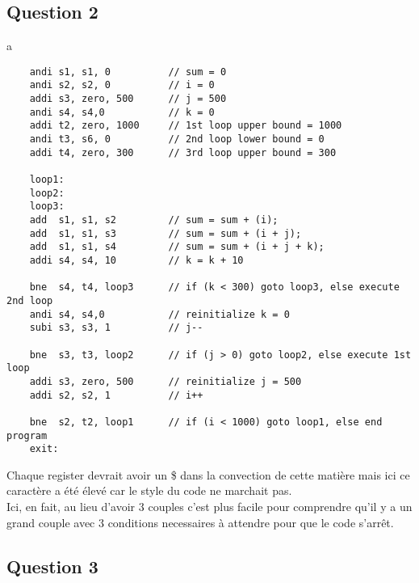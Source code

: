\documentclass{article}
\begin{document}
\newpage\subsection*{Question 2}
\begin{resolution}
    a
    \begin{scriptsize}
        \myRISCV
        \begin{lstlisting}
    andi s1, s1, 0          // sum = 0
    andi s2, s2, 0          // i = 0
    addi s3, zero, 500      // j = 500
    andi s4, s4,0           // k = 0
    addi t2, zero, 1000     // 1st loop upper bound = 1000
    andi t3, s6, 0          // 2nd loop lower bound = 0
    addi t4, zero, 300      // 3rd loop upper bound = 300

    loop1:
    loop2:
    loop3:
    add  s1, s1, s2         // sum = sum + (i);
    add  s1, s1, s3         // sum = sum + (i + j);
    add  s1, s1, s4         // sum = sum + (i + j + k);
    addi s4, s4, 10         // k = k + 10

    bne  s4, t4, loop3      // if (k < 300) goto loop3, else execute 2nd loop
    andi s4, s4,0           // reinitialize k = 0
    subi s3, s3, 1          // j--

    bne  s3, t3, loop2      // if (j > 0) goto loop2, else execute 1st loop
    addi s3, zero, 500      // reinitialize j = 500
    addi s2, s2, 1          // i++

    bne  s2, t2, loop1      // if (i < 1000) goto loop1, else end program
    exit:
        \end{lstlisting}
    \end{scriptsize}
    Chaque register devrait avoir un \$ dans la convection de cette matière mais ici ce caractère a été élevé car le style du code ne marchait pas.\\
    
    Ici, en fait, au lieu d'avoir 3 couples c'est plus facile pour comprendre qu'il y a un grand couple avec 3 conditions necessaires à attendre pour que le code s'arrêt. 
\end{resolution}



\newpage\subsection*{Question 3}
\end{document}
